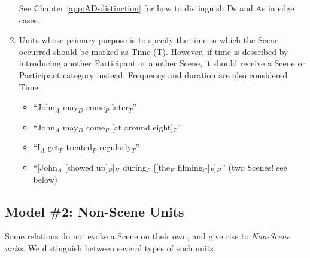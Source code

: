 \documentclass[11pt]{article}
\newcommand{\dd}[1]{{\color{blue}{#1}}}
\newcommand{\dcom}[1]{\textit{\color{blue}{#1}}}
\begin{document}
\begin{enumerate}
    See Chapter \ref{app:AD-distinction} for how to distinguish Ds and As in edge cases.

  \item
    Units whose primary purpose is to specify the time in which the Scene occurred should be marked as {\sc Time} (T). However, if time is described by introducing another Participant or another Scene, it should receive a Scene or Participant category instead. Frequency and duration are also considered {\sc Time}.
    
    \begin{itemize}
    \item ``John$_A$ may$_D$ come$_P$ later$_T$''
    \item ``John$_A$ may$_D$ come$_P$ [at around eight]$_T$''
	\item ``I$_A$ get$_F$ treated$_P$ regularly$_T$''
	\item ``[John$_A$ [showed up]$_P$]$_H$ during$_L$ [[the$_E$ filming$_C$]$_P$]$_H$'' (two Scenes! see below)
    \end{itemize}
    
  
  
\end{enumerate}


\subsection*{Model \#2: Non-Scene Units}\label{model2}



Some relations do not evoke a Scene on their own, and give rise to {\it Non-Scene units}. We distinguish between several types of such units.

\end{document}
